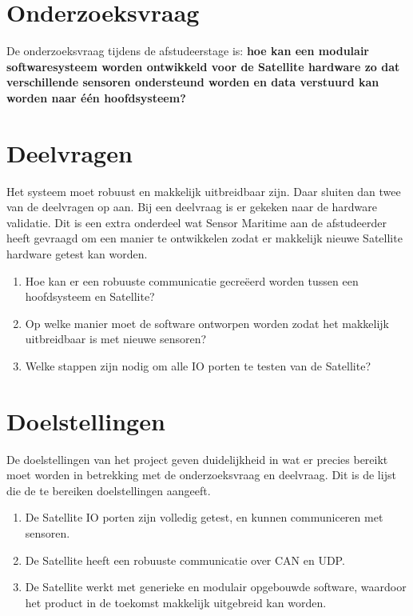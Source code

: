 \section{Onderzoeksvraag}
De onderzoeksvraag tijdens de afstudeerstage is: \textbf{hoe kan een modulair softwaresysteem worden ontwikkeld voor de Satellite hardware zo dat verschillende sensoren ondersteund worden en data verstuurd kan worden naar één hoofdsysteem?}

\section{Deelvragen}
Het systeem moet robuust en makkelijk uitbreidbaar zijn. Daar sluiten dan twee van de deelvragen op aan. Bij een deelvraag is er gekeken naar de hardware validatie. Dit is een extra onderdeel wat Sensor Maritime aan de afstudeerder heeft gevraagd om een manier te ontwikkelen zodat er makkelijk nieuwe Satellite hardware getest kan worden.
\begin{enumerate}
	\item Hoe kan er een robuuste communicatie gecreëerd worden tussen een hoofdsysteem en Satellite?
	\item Op welke manier moet de software ontworpen worden zodat het makkelijk uitbreidbaar is met nieuwe sensoren?
	\item Welke stappen zijn nodig om alle IO porten te testen van de Satellite?
\end{enumerate}

\section{Doelstellingen}
De doelstellingen van het project geven duidelijkheid in wat er precies bereikt moet worden in betrekking met de onderzoeksvraag en deelvraag. Dit is de lijst die de te bereiken doelstellingen aangeeft.
\begin{enumerate}
	\item De Satellite IO porten zijn volledig getest, en kunnen communiceren met sensoren.
	\item De Satellite heeft een robuuste communicatie over CAN en UDP. 
	\item De Satellite werkt met generieke en modulair opgebouwde software, waardoor het product in de toekomst makkelijk uitgebreid kan worden.
\end{enumerate}

\newpage
